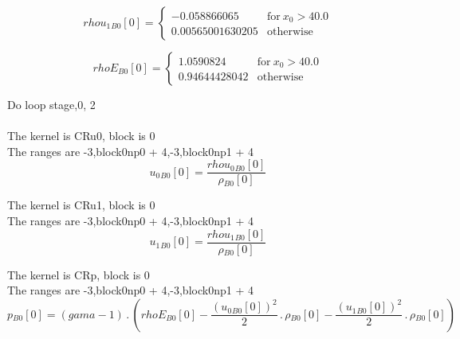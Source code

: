 \documentclass{article}
\begin{document}
\begin{dmath}{rhou_{1}{_{B0}}}[{0}] = \begin{cases} -0.058866065 & \text{for}\: x_{0} > 40.0 \\0.00565001630205 & \text{otherwise} \end{cases}\end{dmath}

\begin{dmath}{rhoE{_{B0}}}[{0}] = \begin{cases} 1.0590824 & \text{for}\: x_{0} > 40.0 \\0.94644428042 & \text{otherwise} \end{cases}\end{dmath}

\noindent Do loop stage,0, 2\\
\\\noindent The kernel is CRu0, block is 0\\\noindent The ranges are -3,block0np0 + 4,-3,block0np1 + 4\\\begin{dmath}{u_{0}{_{B0}}}[{0}] = \frac{{rhou_{0}{_{B0}}}[{0}]}{{\rho{_{B0}}}[{0}]}\end{dmath}

\noindent The kernel is CRu1, block is 0\\\noindent The ranges are -3,block0np0 + 4,-3,block0np1 + 4\\\begin{dmath}{u_{1}{_{B0}}}[{0}] = \frac{{rhou_{1}{_{B0}}}[{0}]}{{\rho{_{B0}}}[{0}]}\end{dmath}

\noindent The kernel is CRp, block is 0\\\noindent The ranges are -3,block0np0 + 4,-3,block0np1 + 4\\\begin{dmath}{p{_{B0}}}[{0}] = \left(gama - 1\right) \,.\, \left({rhoE{_{B0}}}[{0}] - \frac{\left({u_{0}{_{B0}}}[{0}] \right)^{2}}{2} \,.\, {\rho{_{B0}}}[{0}] - \frac{\left({u_{1}{_{B0}}}[{0}] \right)^{2}}{2} \,.\, 
{\rho{_{B0}}}[{0}]\right)\end{dmath}
\end{document}
